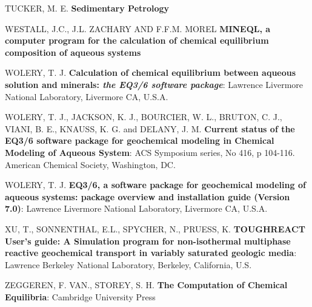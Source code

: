 \documentclass[ppgc,mestrado,English]{iiufrgs}
\begin{document}
\begin{thebibliography}{este-parametro-nao-eh-usado-pelo-estilo-ABNT}
 TUCKER, M. E.
\textbf{Sedimentary Petrology}

 WESTALL, J.C., J.L. ZACHARY AND F.F.M. MOREL
\textbf{MINEQL, a computer program for the calculation of chemical equilibrium composition of aqueous systems}

 WOLERY, T. J. 
\textbf{Calculation of chemical equilibrium between aqueous solution and minerals: \emph{the EQ3/6 software package}}: Lawrence Livermore National Laboratory, Livermore CA, U.S.A.

 WOLERY, T. J., JACKSON, K. J., BOURCIER, W. L., BRUTON, C. J., VIANI, B. E., KNAUSS, K. G. and DELANY, J. M.
\textbf{Current status of the EQ3/6 software package for geochemical modeling in Chemical Modeling of Aqueous System}: ACS Symposium series, No 416, p 104-116. American Chemical Society, Washington, DC.

 WOLERY, T. J.
\textbf{EQ3/6, a software package for geochemical modeling of aqueous systems: package overview and installation guide (Version 7.0)}: Lawrence Livermore National Laboratory, Livermore CA, U.S.A.

 XU, T., SONNENTHAL, E.L., SPYCHER, N., PRUESS, K.
\textbf{TOUGHREACT User's guide: A Simulation program for non-isothermal multiphase reactive geochemical transport in variably saturated geologic media}: Lawrence Berkeley National Laboratory, Berkeley, California, U.S.

 ZEGGEREN, F. VAN., STOREY, S. H. 
\textbf{The Computation of Chemical Equilibria}: Cambridge University Press

\end{thebibliography}
\end{document}
